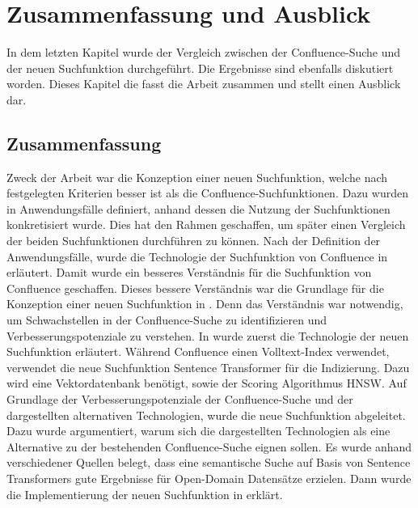\chapter{Zusammenfassung und Ausblick}
In dem letzten Kapitel wurde der Vergleich zwischen der Confluence-Suche und der neuen Suchfunktion durchgeführt.
Die Ergebnisse sind ebenfalls diskutiert worden.
Dieses Kapitel die fasst die Arbeit zusammen und stellt einen Ausblick dar.

\section{Zusammenfassung}
Zweck der Arbeit war die Konzeption einer neuen Suchfunktion, welche nach festgelegten Kriterien besser ist als die Confluence-Suchfunktionen.
Dazu wurden in  Anwendungsfälle definiert, anhand dessen die Nutzung der Suchfunktionen konkretisiert wurde.
Dies hat den Rahmen geschaffen, um später einen Vergleich der beiden Suchfunktionen durchführen zu können.
Nach der Definition der Anwendungsfälle, wurde die Technologie der Suchfunktion von Confluence in  erläutert.
Damit wurde ein besseres Verständnis für die Suchfunktion von Confluence geschaffen.
Dieses bessere Verständnis war die Grundlage für die Konzeption einer neuen Suchfunktion in .
Denn das Verständnis war notwendig, um Schwachstellen in der Confluence-Suche zu identifizieren und Verbesserungspotenziale zu verstehen.
In  wurde zuerst die Technologie der neuen Suchfunktion erläutert.
Während Confluence einen Volltext-Index verwendet, verwendet die neue Suchfunktion Sentence Transformer für die Indizierung.
Dazu wird eine Vektordatenbank benötigt, sowie der Scoring Algorithmus HNSW.
Auf Grundlage der Verbesserungspotenziale der Confluence-Suche und der dargestellten alternativen Technologien, wurde die neue Suchfunktion abgeleitet.
Dazu wurde argumentiert, warum sich die dargestellten Technologien als eine Alternative zu der bestehenden Confluence-Suche eignen sollen.
Es wurde anhand verschiedener Quellen belegt, dass eine semantische Suche auf Basis von Sentence Transformers gute Ergebnisse für Open-Domain Datensätze erzielen. 
Dann wurde die Implementierung der neuen Suchfunktion in  erklärt.\\

